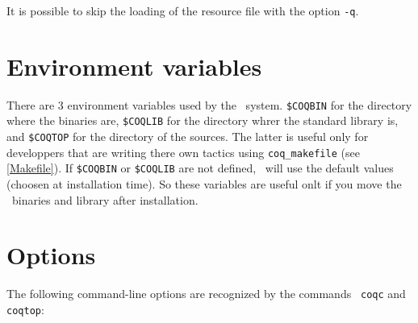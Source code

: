 It is possible to skip the loading of the resource file with the
option \verb:-q:.

\section{Environment variables}
\label{EnvVariables}

There are 3 environment variables used by the \Coq\ system.
\verb:$COQBIN: for the directory where the binaries are,
\verb:$COQLIB: for the directory whrer the standard library is, and 
\verb:$COQTOP: for the directory of the sources. The latter is useful
only for developpers that are writing there own tactics using
\texttt{coq\_makefile} (see \ref{Makefile}). If \verb:$COQBIN: or
\verb:$COQLIB: are not defined, \Coq\ will use the default values
(choosen at installation time). So these variables are useful onlt if
you move the \Coq\ binaries and library after installation.

\section{Options}

The following command-line options are recognized by the commands {\tt
  coqc} and {\tt coqtop}:

